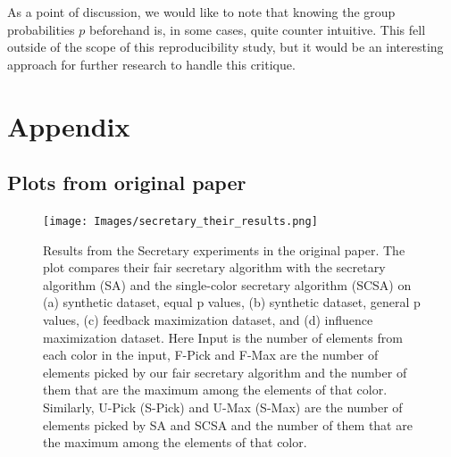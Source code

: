 As a point of discussion, we would like to note that knowing the group probabilities $p$ beforehand is, in some cases, quite counter intuitive. This fell outside of the scope of this reproducibility study, but it would be an interesting approach for further research to handle this critique.




\newpage



\section*{Appendix}

\subsection{Plots from original paper}

\begin{figure}[H]
    \texttt{[image: Images/secretary\_their\_results.png]}
    \caption{Results from the Secretary experiments in the original paper. The plot compares their fair secretary algorithm with the secretary algorithm (SA) and the single-color secretary algorithm (SCSA) on (a) synthetic dataset, equal p values, (b) synthetic dataset, general p values, (c) feedback maximization dataset, and (d) influence maximization dataset. Here Input is the number of elements from each color in the input, F-Pick and F-Max are the number of elements picked by our fair secretary algorithm and the number of them that are the maximum among the elements of that color. Similarly, U-Pick (S-Pick) and U-Max (S-Max) are the number of elements picked by SA and SCSA and the number of them that are the maximum among the elements of that color.}
    \label{fig:secretary_original_results}
\end{figure}

